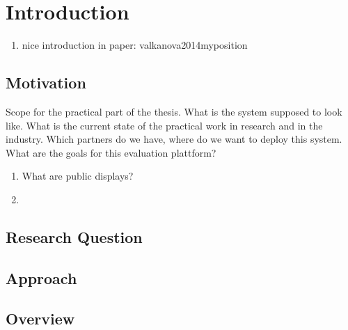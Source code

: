 \section{Introduction}
\label{sec:introduction}



\begin{enumerate}
\item nice introduction in paper: valkanova2014myposition
\end{enumerate}



\subsection{Motivation}

Scope for the practical part of the thesis. What is the system supposed to look like. What is the current state of the practical work in research and in the industry. Which partners do we have, where do we want to deploy this system. What are the goals for this evaluation plattform?


  \begin{enumerate}
  \item What are public displays?
  \item 
  \end{enumerate}


\subsection{Research Question}



\subsection{Approach}



\subsection{Overview}










